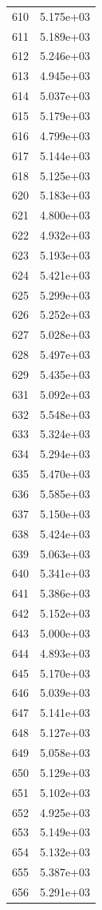 \documentclass[12pt]{article}
\begin{document}
\begin{longtable}{@{}cc@{}}
610 & 5.175e+03 \\
611 & 5.189e+03 \\
612 & 5.246e+03 \\
613 & 4.945e+03 \\
614 & 5.037e+03 \\
615 & 5.179e+03 \\
616 & 4.799e+03 \\
617 & 5.144e+03 \\
618 & 5.125e+03 \\
620 & 5.183e+03 \\
621 & 4.800e+03 \\
622 & 4.932e+03 \\
623 & 5.193e+03 \\
624 & 5.421e+03 \\
625 & 5.299e+03 \\
626 & 5.252e+03 \\
627 & 5.028e+03 \\
628 & 5.497e+03 \\
629 & 5.435e+03 \\
631 & 5.092e+03 \\
632 & 5.548e+03 \\
633 & 5.324e+03 \\
634 & 5.294e+03 \\
635 & 5.470e+03 \\
636 & 5.585e+03 \\
637 & 5.150e+03 \\
638 & 5.424e+03 \\
639 & 5.063e+03 \\
640 & 5.341e+03 \\
641 & 5.386e+03 \\
642 & 5.152e+03 \\
643 & 5.000e+03 \\
644 & 4.893e+03 \\
645 & 5.170e+03 \\
646 & 5.039e+03 \\
647 & 5.141e+03 \\
648 & 5.127e+03 \\
649 & 5.058e+03 \\
650 & 5.129e+03 \\
651 & 5.102e+03 \\
652 & 4.925e+03 \\
653 & 5.149e+03 \\
654 & 5.132e+03 \\
655 & 5.387e+03 \\
656 & 5.291e+03 \\

\end{longtable}
\end{document}
